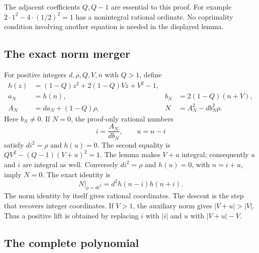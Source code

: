 The adjacent coefficients $Q,Q-1$ are essential to this proof.
For example $2\cdot1^2-4\cdot(1/2)^2=1$ has a nonintegral rational
ordinate.  No coprimality condition involving another equation is needed
in the displayed lemma.

\subsection{The exact norm merger}

For positive integers $d,\rho,Q,V,n$ with $Q>1$, define
\begin{align}
 h(z)&=(1-Q)z^2+2(1-Q)Vz+V^2-1,\nonumber\\
 a_N&=h(n),& b_N&=2(1-Q)(n+V),\nonumber\\
 A_N&=d a_N+(1-Q)\rho,&
 N&=A_N^2-d b_N^2\rho.                                 \label{eq:sat-norm}
\end{align}
Here $b_N\ne0$.  If $N=0$, the proof-only rational numbers
\[
 i=\frac{A_N}{d b_N},\qquad u=n-i
\]
satisfy $di^2=\rho$ and $h(u)=0$.  The second equality is
$QV^2-(Q-1)(V+u)^2=1$.  The lemma makes $V+u$ integral; consequently
$u$ and $i$ are integral as well.  Conversely $di^2=\rho$ and
$h(u)=0$, with $n=i+u$, imply $N=0$.  The exact identity is
\begin{equation}
 N\big|_{\rho=di^2}=d^2h(n-i)h(n+i).                    \label{eq:sat-factor}
\end{equation}
The norm identity by itself gives rational coordinates.  The descent is
the step that recovers integer coordinates.
If $V>1$, the auxiliary norm gives $|V+u|>|V|$.  Thus a positive lift is
obtained by replacing $i$ with $|i|$ and $u$ with $|V+u|-V$.

\subsection{The complete polynomial}

